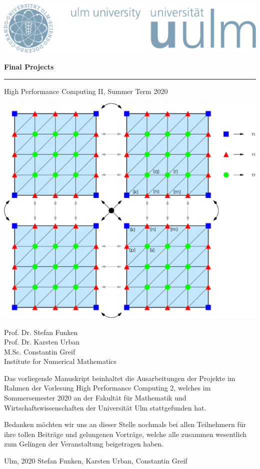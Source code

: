 \documentclass[paper=a4,11pt,oneside]{article}
\theoremstyle{definition}
\theoremstyle{definition}
\theoremstyle{definition}
\theoremstyle{definition}
\theoremstyle{definition}
\theoremstyle{definition}
\theoremstyle{definition}
\theoremstyle{remark}
\theoremstyle{definition}
\begin{document}
\thispagestyle{empty}
\begin{flushright}
  \includegraphics[width=0.5\linewidth]{Grafiken/UniLogo.pdf}
\vspace*{50pt}

  \begin{LARGE}

    \textbf{\sc Final Projects} \\
    \rule{340pt}{1.5pt}

\end{LARGE}
\begin{Large}
High Performance Computing II, Summer Term 2020
\end{Large}

\vspace*{70pt}

\begin{center}
 \includegraphics[width=0.4 \linewidth]{Grafiken/decomp.eps}
\end{center}

\vspace*{80pt}

Prof. Dr. Stefan Funken  \\
Prof. Dr. Karsten Urban\\
M.Sc. Constantin Greif \\
  \vspace{8pt}
  Institute for Numerical Mathematics
  
\newpage
\vspace{-2cm}
Das vorliegende Manuskript beinhaltet die Ausarbeitungen der
Projekte im Rahmen der Vorlesung High Performance Computing 2, 
welches im Sommersemester 2020 an der Fakult\"at f\"ur 
Mathematik und Wirtschaftswissenschaften der Universit\"at Ulm 
stattgefunden hat.

\medskip

Bedanken m\"ochten wir uns an dieser Stelle nochmals bei allen Teilnehmern f\"ur
ihre tollen Beitr\"age und gelungenen Vortr\"age, welche alle zusammen wesentlich 
zum Gelingen der Veranstaltung beigetragen haben.

\bigskip
\bigskip

Ulm, 2020 \hfill  Stefan Funken, Karsten Urban, Constantin Greif

  
  
  
 

\end{flushright}
\thispagestyle{empty} 
\end{document}
